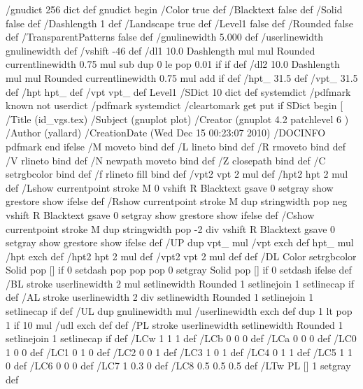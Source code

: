 /gnudict 256 dict def
gnudict begin
%
%
/Color true def
/Blacktext false def
/Solid false def
/Dashlength 1 def
/Landscape true def
/Level1 false def
/Rounded false def
/TransparentPatterns false def
/gnulinewidth 5.000 def
/userlinewidth gnulinewidth def
%
/vshift -46 def
/dl1 {
  10.0 Dashlength mul mul
  Rounded { currentlinewidth 0.75 mul sub dup 0 le { pop 0.01 } if } if
} def
/dl2 {
  10.0 Dashlength mul mul
  Rounded { currentlinewidth 0.75 mul add } if
} def
/hpt_ 31.5 def
/vpt_ 31.5 def
/hpt hpt_ def
/vpt vpt_ def
Level1 {} {
/SDict 10 dict def
systemdict /pdfmark known not {
  userdict /pdfmark systemdict /cleartomark get put
} if
SDict begin [
  /Title (id_vgs.tex)
  /Subject (gnuplot plot)
  /Creator (gnuplot 4.2 patchlevel 6 )
  /Author (yallard)
  /CreationDate (Wed Dec 15 00:23:07 2010)
  /DOCINFO pdfmark
end
} ifelse
%
%
/M {moveto} bind def
/L {lineto} bind def
/R {rmoveto} bind def
/V {rlineto} bind def
/N {newpath moveto} bind def
/Z {closepath} bind def
/C {setrgbcolor} bind def
/f {rlineto fill} bind def
/vpt2 vpt 2 mul def
/hpt2 hpt 2 mul def
/Lshow {currentpoint stroke M 0 vshift R 
	Blacktext {gsave 0 setgray show grestore} {show} ifelse} def
/Rshow {currentpoint stroke M dup stringwidth pop neg vshift R
	Blacktext {gsave 0 setgray show grestore} {show} ifelse} def
/Cshow {currentpoint stroke M dup stringwidth pop -2 div vshift R 
	Blacktext {gsave 0 setgray show grestore} {show} ifelse} def
/UP {dup vpt_ mul /vpt exch def hpt_ mul /hpt exch def
  /hpt2 hpt 2 mul def /vpt2 vpt 2 mul def} def
/DL {Color {setrgbcolor Solid {pop []} if 0 setdash}
 {pop pop pop 0 setgray Solid {pop []} if 0 setdash} ifelse} def
/BL {stroke userlinewidth 2 mul setlinewidth
	Rounded {1 setlinejoin 1 setlinecap} if} def
/AL {stroke userlinewidth 2 div setlinewidth
	Rounded {1 setlinejoin 1 setlinecap} if} def
/UL {dup gnulinewidth mul /userlinewidth exch def
	dup 1 lt {pop 1} if 10 mul /udl exch def} def
/PL {stroke userlinewidth setlinewidth
	Rounded {1 setlinejoin 1 setlinecap} if} def
/LCw {1 1 1} def
/LCb {0 0 0} def
/LCa {0 0 0} def
/LC0 {1 0 0} def
/LC1 {0 1 0} def
/LC2 {0 0 1} def
/LC3 {1 0 1} def
/LC4 {0 1 1} def
/LC5 {1 1 0} def
/LC6 {0 0 0} def
/LC7 {1 0.3 0} def
/LC8 {0.5 0.5 0.5} def
/LTw {PL [] 1 setgray} def
